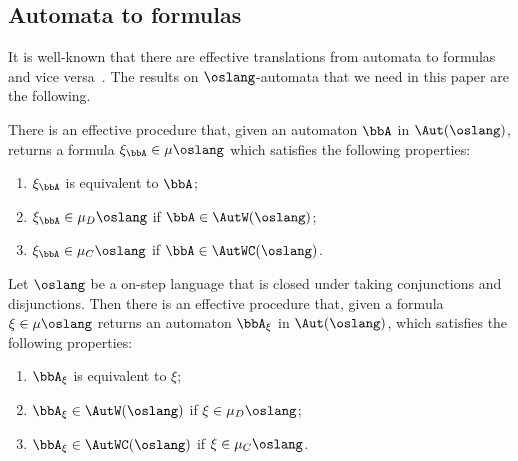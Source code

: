 \subsection{Automata to formulas}
   \label{sec:parity-to-mc}

It is well-known that there are effective translations from automata to formulas
and vice versa~\cite{ALG02}.
The results on $\oslang$-automata that we need in this paper are the 
following.

\begin{theorem}\label{t:autofor}
There is an effective procedure that, given an automaton $\bbA$ in 
$\Aut(\oslang)$, returns a formula $\xi_{\bbA} \in \mu\oslang$ which satisfies
the following properties:
\begin{enumerate}[(1)]
    
\item $\xi_{\bbA}$ is equivalent to $\bbA$;

\item $\xi_{\bbA} \in \mu_{D}\oslang$ if $\bbA \in \AutW(\oslang)$;

\item $\xi_{\bbA} \in \mu_{C}\oslang$ if $\bbA \in \AutWC(\oslang)$.
\end{enumerate}
\end{theorem}

\begin{theorem}\label{t:fortoaut}
Let $\oslang$ be a on-step language that is closed under taking conjunctions and 
disjunctions.
Then there is an effective procedure that, given a formula $\xi \in \mu\oslang$
returns an automaton $\bbA_{\xi}$ in $\Aut(\oslang)$, which satisfies the 
following properties:
\begin{enumerate}[(1)]
\item $\bbA_\xi$ is equivalent to $\xi$;
\item  $\bbA_\xi \in \AutW(\oslang)$ if $\xi \in \mu_{D}\oslang$;
\item  $\bbA_\xi \in \AutWC(\oslang)$ if $\xi \in \mu_{C}\oslang$.
\end{enumerate}
\end{theorem}
